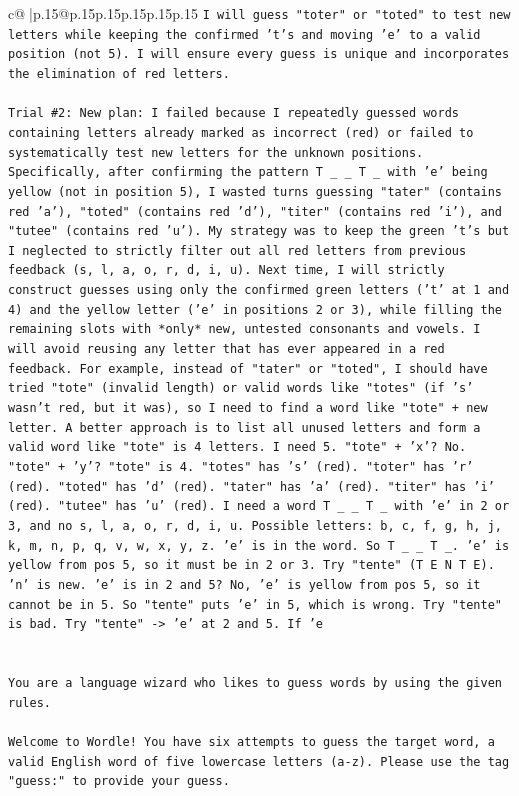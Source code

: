 \documentclass{article}
\begin{document}
{\begin{supertabular}{c@{$\;$}|p{.15\linewidth}@{}p{.15\linewidth}p{.15\linewidth}p{.15\linewidth}p{.15\linewidth}p{.15\linewidth}}
{{{\texttt{I will guess "toter" or "toted" to test new letters while keeping the confirmed 't's and moving 'e' to a valid position (not 5). I will ensure every guess is unique and incorporates the elimination of red letters.} \\
\\ 
\texttt{Trial \#2: New plan: I failed because I repeatedly guessed words containing letters already marked as incorrect (red) or failed to systematically test new letters for the unknown positions. Specifically, after confirming the pattern T \_ \_ T \_ with 'e' being yellow (not in position 5), I wasted turns guessing "tater" (contains red 'a'), "toted" (contains red 'd'), "titer" (contains red 'i'), and "tutee" (contains red 'u'). My strategy was to keep the green 't's but I neglected to strictly filter out all red letters from previous feedback (s, l, a, o, r, d, i, u). Next time, I will strictly construct guesses using only the confirmed green letters ('t' at 1 and 4) and the yellow letter ('e' in positions 2 or 3), while filling the remaining slots with *only* new, untested consonants and vowels. I will avoid reusing any letter that has ever appeared in a red feedback. For example, instead of "tater" or "toted", I should have tried "tote" (invalid length) or valid words like "totes" (if 's' wasn't red, but it was), so I need to find a word like "tote" + new letter. A better approach is to list all unused letters and form a valid word like "tote" is 4 letters. I need 5. "tote" + 'x'? No. "tote" + 'y'? "tote" is 4. "totes" has 's' (red). "toter" has 'r' (red). "toted" has 'd' (red). "tater" has 'a' (red). "titer" has 'i' (red). "tutee" has 'u' (red). I need a word T \_ \_ T \_ with 'e' in 2 or 3, and no s, l, a, o, r, d, i, u. Possible letters: b, c, f, g, h, j, k, m, n, p, q, v, w, x, y, z. 'e' is in the word. So T \_ \_ T \_. 'e' is yellow from pos 5, so it must be in 2 or 3. Try "tente" (T E N T E). 'n' is new. 'e' is in 2 and 5? No, 'e' is yellow from pos 5, so it cannot be in 5. So "tente" puts 'e' in 5, which is wrong. Try "tente" is bad. Try "tente" {-}> 'e' at 2 and 5. If 'e} \\
\\ 
\\ 
\texttt{You are a language wizard who likes to guess words by using the given rules.} \\
\\ 
\texttt{Welcome to Wordle! You have six attempts to guess the target word, a valid English word of five lowercase letters (a{-}z). Please use the tag "guess:" to provide your guess.} \\
}}}
\end{supertabular}}
\end{document}
